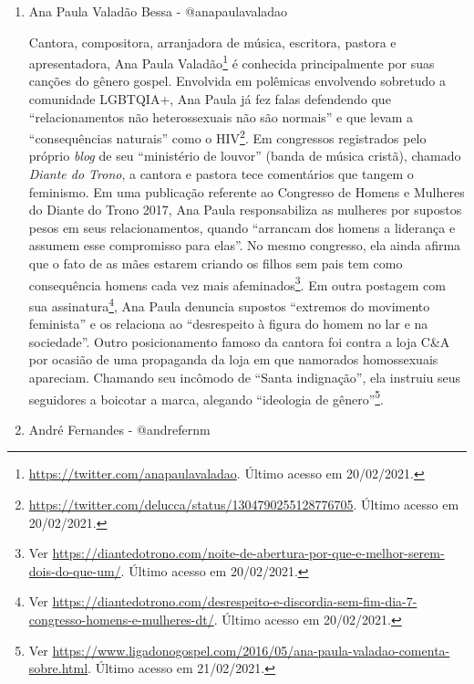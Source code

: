 \documentclass[
	12pt,				%
	openright,			%
	twoside,			%
	a4paper,			%
	english,			%
	brazil				%
	]{abntex2}
\begin{document}
\begin{anexosenv}
\begin{enumerate}
 \begin{figure}[!htbp]
    \centering
    \texttt{[image: anapaulah\_3.png]}
    \caption{Postagem no Twitter de Ana Paula Henkel. Disponível em \url{https://twitter.com/AnaPaulaVolei/status/1059172169488326656}. Último acesso em 20/02/2021.}
 \end{figure}

 \item Ana Paula Valadão Bessa - @anapaulavaladao\label{anapaulav}
 
 Cantora, compositora, arranjadora de música, escritora, pastora e apresentadora, Ana Paula Valadão\footnote{\url{https://twitter.com/anapaulavaladao}. Último acesso em 20/02/2021.} é conhecida principalmente por suas canções do gênero gospel. Envolvida em polêmicas envolvendo sobretudo a comunidade LGBTQIA+, Ana Paula já fez falas defendendo que ``relacionamentos não heterossexuais não são normais'' e que levam a ``consequências naturais'' como o HIV\footnote{\url{https://twitter.com/delucca/status/1304790255128776705}. Último acesso em 20/02/2021.}. Em congressos registrados pelo próprio \textit{blog} de seu ``ministério de louvor'' (banda de música cristã), chamado \textit{Diante do Trono}, a cantora e pastora tece comentários que tangem o feminismo. Em uma publicação referente ao Congresso de Homens e Mulheres do Diante do Trono 2017, Ana Paula responsabiliza as mulheres por supostos pesos em seus relacionamentos, quando ``arrancam dos homens a liderança e assumem esse compromisso para elas''. No mesmo congresso, ela ainda afirma que o fato de as mães estarem criando os filhos sem pais tem como consequência homens cada vez mais afeminados\footnote{Ver \url{https://diantedotrono.com/noite-de-abertura-por-que-e-melhor-serem-dois-do-que-um/}. Último acesso em 20/02/2021.}. Em outra postagem com sua assinatura\footnote{Ver \url{https://diantedotrono.com/desrespeito-e-discordia-sem-fim-dia-7-congresso-homens-e-mulheres-dt/}. Último acesso em 20/02/2021.}, Ana Paula denuncia supostos ``extremos do movimento feminista'' e os relaciona ao ``desrespeito à figura do homem no lar e na sociedade''. Outro posicionamento famoso da cantora foi contra a loja C&A por ocasião de uma propaganda da loja em que namorados homossexuais apareciam. Chamando seu incômodo de ``Santa indignação'', ela instruiu seus seguidores a boicotar a marca, alegando ``ideologia de gênero''\footnote{Ver \url{https://www.ligadonogospel.com/2016/05/ana-paula-valadao-comenta-sobre.html}. Último acesso em 21/02/2021.}.

 \item André Fernandes - @andrefernm
 

\end{enumerate}
\end{anexosenv}
\end{document}
